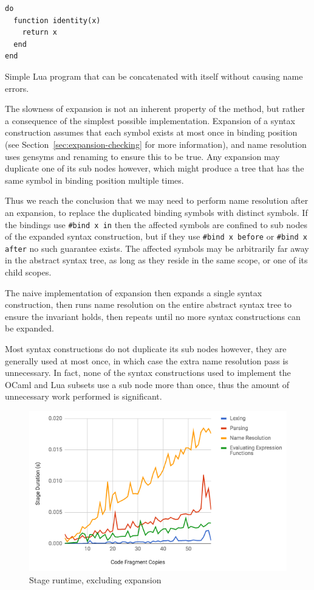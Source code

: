\documentclass{kththesis}
\begin{document}
\begin{listing}[h]
\begin{verbatim}
do
  function identity(x)
    return x
  end
end
\end{verbatim}
\caption{Simple Lua program that can be concatenated with itself without causing name errors.}
\label{lst:lua-fragment}
\end{listing}

The slowness of expansion is not an inherent property of the method, but rather a consequence of the simplest possible implementation. Expansion of a syntax construction assumes that each symbol exists at most once in binding position (see Section~\ref{sec:expansion-checking} for more information), and name resolution uses gensyms and renaming to ensure this to be true. Any expansion may duplicate one of its sub nodes however, which might produce a tree that has the same symbol in binding position multiple times.

Thus we reach the conclusion that we may need to perform name resolution after an expansion, to replace the duplicated binding symbols with distinct symbols. If the bindings use \texttt{#bind x in} then the affected symbols are confined to sub nodes of the expanded syntax construction, but if they use \texttt{#bind x before} or \texttt{#bind x after} no such guarantee exists. The affected symbols may be arbitrarily far away in the abstract syntax tree, as long as they reside in the same scope, or one of its child scopes.

The naive implementation of expansion then expands a single syntax construction, then runs name resolution on the entire abstract syntax tree to ensure the invariant holds, then repeats until no more syntax constructions can be expanded.

Most syntax constructions do not duplicate its sub nodes however, they are generally used at most once, in which case the extra name resolution pass is unnecessary. In fact, none of the syntax constructions used to implement the OCaml and Lua subsets use a sub node more than once, thus the amount of unnecessary work performed is significant.

\begin{figure}[h]
\includegraphics[width=\textwidth]{resources/performance-graph-without-expansion}
\caption{Stage runtime, excluding expansion}
\label{fig:performance-graph-without-expansion}
\end{figure}
\end{document}

